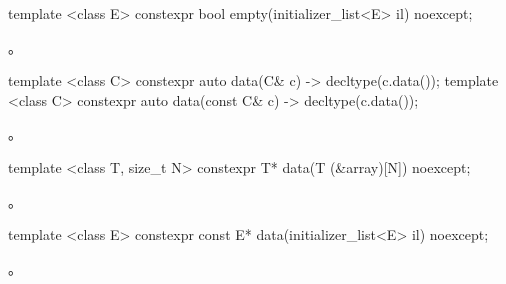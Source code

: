 \begin{itemdecl}
template <class E> constexpr bool empty(initializer_list<E> il) noexcept;
\end{itemdecl}
\begin{itemdescr}
\pnum \returns {}。
\end{itemdescr}

\begin{itemdecl}
template <class C> constexpr auto data(C& c) -> decltype(c.data());
template <class C> constexpr auto data(const C& c) -> decltype(c.data());
\end{itemdecl}
\begin{itemdescr}
\pnum \returns {}。
\end{itemdescr}

\begin{itemdecl}
template <class T, size_t N> constexpr T* data(T (&array)[N]) noexcept;
\end{itemdecl}
\begin{itemdescr}
\pnum \returns {}。
\end{itemdescr}

\begin{itemdecl}
template <class E> constexpr const E* data(initializer_list<E> il) noexcept;
\end{itemdecl}
\begin{itemdescr}
\pnum \returns {}。
\end{itemdescr}
